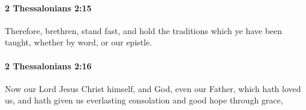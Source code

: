 		\paragraph{2 Thessalonians 2:15} %
			\label{2THESSALONIANS-2-15}

			Therefore, brethren, stand fast, and hold the traditions which ye have been taught, whether by word, or our epistle.

			\begin{framed}
			\scriptsize
				\begin{compactdesc}
					\item[SBLG] 
				\end{compactdesc}
			\end{framed}

		\paragraph{2 Thessalonians 2:16} %
			\label{2THESSALONIANS-2-16}

			Now our Lord Jesus Christ himself, and God, even our Father, which hath loved us, and hath given us everlasting consolation and good hope through grace,

